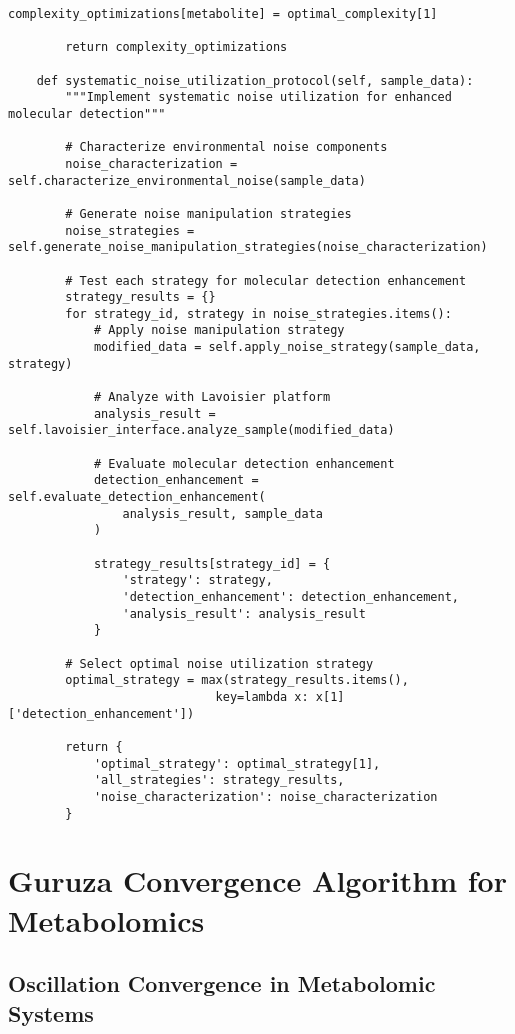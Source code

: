 \documentclass[12pt,a4paper]{article}
\begin{document}
\begin{lstlisting}[style=pythonstyle, caption=Environmental Complexity Optimization for Metabolomics]
            complexity_optimizations[metabolite] = optimal_complexity[1]
        
        return complexity_optimizations
    
    def systematic_noise_utilization_protocol(self, sample_data):
        """Implement systematic noise utilization for enhanced molecular detection"""
        
        # Characterize environmental noise components
        noise_characterization = self.characterize_environmental_noise(sample_data)
        
        # Generate noise manipulation strategies
        noise_strategies = self.generate_noise_manipulation_strategies(noise_characterization)
        
        # Test each strategy for molecular detection enhancement
        strategy_results = {}
        for strategy_id, strategy in noise_strategies.items():
            # Apply noise manipulation strategy
            modified_data = self.apply_noise_strategy(sample_data, strategy)
            
            # Analyze with Lavoisier platform
            analysis_result = self.lavoisier_interface.analyze_sample(modified_data)
            
            # Evaluate molecular detection enhancement
            detection_enhancement = self.evaluate_detection_enhancement(
                analysis_result, sample_data
            )
            
            strategy_results[strategy_id] = {
                'strategy': strategy,
                'detection_enhancement': detection_enhancement,
                'analysis_result': analysis_result
            }
        
        # Select optimal noise utilization strategy
        optimal_strategy = max(strategy_results.items(),
                             key=lambda x: x[1]['detection_enhancement'])
        
        return {
            'optimal_strategy': optimal_strategy[1],
            'all_strategies': strategy_results,
            'noise_characterization': noise_characterization
        }
\end{lstlisting}

\section{Guruza Convergence Algorithm for Metabolomics}

\subsection{Oscillation Convergence in Metabolomic Systems}
\end{document}
